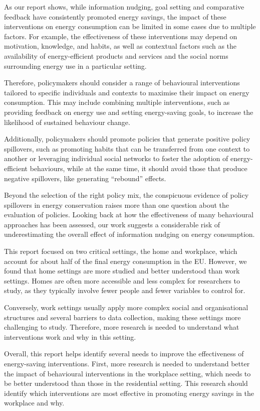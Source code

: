 \documentclass[
  12pt,
  captions=heading]{scrreport}
\begin{document}
As our report shows, while information nudging, goal setting and
comparative feedback have consistently promoted energy savings, the
impact of these interventions on energy consumption can be limited in
some cases due to multiple factors. For example, the effectiveness of
these interventions may depend on motivation, knowledge, and habits, as
well as contextual factors such as the availability of energy-efficient
products and services and the social norms surrounding energy use in a
particular setting.

Therefore, policymakers should consider a range of behavioural
interventions tailored to specific individuals and contexts to maximise
their impact on energy consumption. This may include combining multiple
interventions, such as providing feedback on energy use and setting
energy-saving goals, to increase the likelihood of sustained behaviour
change.

Additionally, policymakers should promote policies that generate
positive policy spillovers, such as promoting habits that can be
transferred from one context to another or leveraging individual social
networks to foster the adoption of energy-efficient behaviours, while at
the same time, it should avoid those that produce negative spillovers,
like generating ``rebound'' effects.

Beyond the selection of the right policy mix, the conspicuous evidence
of policy spillovers in energy conservation raises more than one
question about the evaluation of policies. Looking back at how the
effectiveness of many behavioural approaches has been assessed, our work
suggests a considerable risk of underestimating the overall effect of
information nudging on energy consumption.

This report focused on two critical settings, the home and workplace,
which account for about half of the final energy consumption in the EU.
However, we found that home settings are more studied and better
understood than work settings. Homes are often more accessible and less
complex for researchers to study, as they typically involve fewer people
and fewer variables to control for.

Conversely, work settings usually apply more complex social and
organisational structures and several barriers to data collection,
making these settings more challenging to study. Therefore, more
research is needed to understand what interventions work and why in this
setting.

Overall, this report helps identify several needs to improve the
effectiveness of energy-saving interventions. First, more research is
needed to understand better the impact of behavioural interventions in
the workplace setting, which needs to be better understood than those in
the residential setting. This research should identify which
interventions are most effective in promoting energy savings in the
workplace and why.
\end{document}
